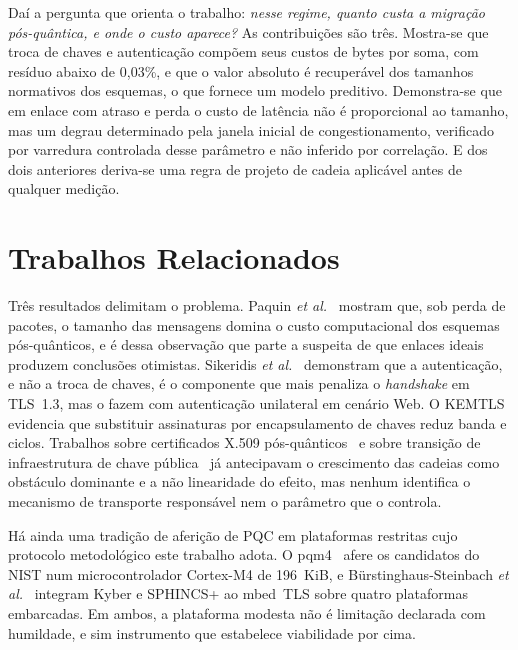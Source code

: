 \documentclass[conference]{IEEEtran}
\begin{document}
Daí a pergunta que orienta o trabalho: \emph{nesse regime, quanto custa a
migração pós-quântica, e onde o custo aparece?} As contribuições são três.
Mostra-se que troca de chaves e autenticação compõem seus custos de bytes por
soma, com resíduo abaixo de 0,03\%, e que o valor absoluto é recuperável dos
tamanhos normativos dos esquemas, o que fornece um modelo preditivo. Demonstra-se
que em enlace com atraso e perda o custo de latência não é proporcional ao
tamanho, mas um degrau determinado pela janela inicial de congestionamento,
verificado por varredura controlada desse parâmetro e não inferido por
correlação. E dos dois anteriores deriva-se uma regra de projeto de cadeia
aplicável antes de qualquer medição.

\section{Trabalhos Relacionados}
\label{sec:referencial}

Três resultados delimitam o problema. Paquin \textit{et
al.}~\cite{paquin2020benchmarking} mostram que, sob perda de pacotes, o tamanho
das mensagens domina o custo computacional dos esquemas pós-quânticos, e é dessa
observação que parte a suspeita de que enlaces ideais produzem conclusões
otimistas. Sikeridis \textit{et al.}~\cite{sikeridis2020postquantum} demonstram
que a autenticação, e não a troca de chaves, é o componente que mais penaliza o
\textit{handshake} em TLS~1.3, mas o fazem com autenticação unilateral em cenário
Web. O KEMTLS~\cite{schwabe2020kemtls} evidencia que substituir assinaturas por
encapsulamento de chaves reduz banda e ciclos. Trabalhos sobre certificados X.509
pós-quânticos~\cite{kampanakis2018viability} e sobre transição de infraestrutura
de chave pública~\cite{bindel2017transitioning} já antecipavam o crescimento das
cadeias como obstáculo dominante e a não linearidade do efeito, mas nenhum
identifica o mecanismo de transporte responsável nem o parâmetro que o controla.

Há ainda uma tradição de aferição de PQC em plataformas restritas cujo protocolo
metodológico este trabalho adota. O pqm4~\cite{kannwischer2019pqm4} afere os
candidatos do NIST num microcontrolador Cortex-M4 de 196~KiB, e
Bürstinghaus-Steinbach \textit{et al.}~\cite{burstinghaus2020embedded} integram
Kyber e SPHINCS+ ao mbed~TLS sobre quatro plataformas embarcadas. Em ambos, a
plataforma modesta não é limitação declarada com humildade, e sim instrumento que
estabelece viabilidade por cima.
\end{document}
